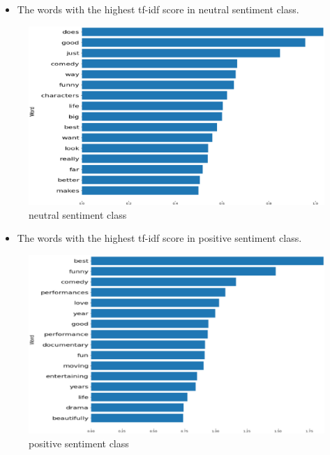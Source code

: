 \documentclass[
 size=14pt,
 paper=smartboard,  %
 mode=present, 		%
 display=slides, 	%
 style=tuliplab,  	%
 pauseslide,
 fleqn,leqno]{powerdot}
\begin{document}
\begin{slide}[toc=,bm=]{}
  \twocolumn
  {
    
  \begin{itemize}
  \item
  \smallskip
  The words with the highest tf-idf score in neutral sentiment class.

 \end{itemize}
  \vspace{0.75cm}
  \begin{figure}
    \centering
    \includegraphics[width=1.05\textwidth,natwidth=896,natheight=500]{figures/nt.eps}
    \caption{neutral sentiment class}\label{Checking for outliers}
  \end{figure}
  }
  {
  
  \begin{itemize}
  \item
  The words with the highest tf-idf score in positive sentiment class.
  

  \end{itemize}
  \bigskip
  \begin{figure}
    \centering
    \includegraphics[width=1.05\textwidth,natwidth=843,natheight=500]{figures/ps.eps}
    \caption{positive sentiment class}\label{Checking for outliers}
  \end{figure}
  }
  

\end{slide}
\end{document}
